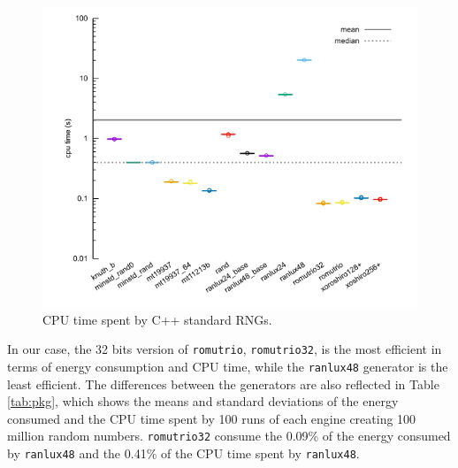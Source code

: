 \documentclass[sigconf]{acmart}
\begin{document}
\begin{figure}
\centering
\includegraphics[width=\columnwidth]{cpu.png}
\caption{CPU time spent by C++ standard RNGs.}
\label{fig:cpu}
\end{figure}


In our case, the 32 bits version of \texttt{romutrio}, \texttt{romutrio32}, is the most efficient in terms of energy consumption and CPU time, while the \texttt{ranlux48} generator is the least efficient. The differences between the generators are also reflected in Table \ref{tab:pkg}, which shows the means and standard deviations of the energy consumed and the CPU time spent by 100 runs of each engine creating 100 million random numbers. \texttt{romutrio32} consume the 0.09\% of the energy consumed by \texttt{ranlux48} and the 0.41\% of the CPU time spent by \texttt{ranlux48}.
\end{document}
